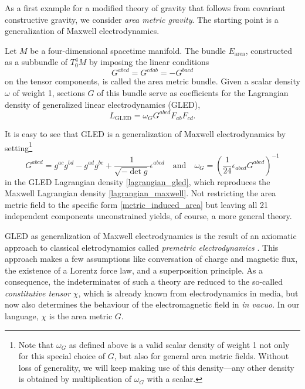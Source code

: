 As a first example for a modified theory of gravity that follows from covariant constructive gravity, we consider \emph{area metric gravity}. The starting point is a generalization of Maxwell electrodynamics.
\begin{definition}\label{def_gled}
  Let $M$ be a four-dimensional spacetime manifold. The bundle $E_\text{area}$, constructed as a subbundle of $T^4_0M$ by imposing the linear conditions
  \begin{equation}
    G^{abcd} = G^{cdab} = -G^{bacd}
  \end{equation}
  on the tensor components, is called the area metric bundle. Given a scalar density $\omega$ of weight 1, sections $G$ of this bundle serve as coefficients for the Lagrangian density of generalized linear electrodynamics (GLED),
  \begin{equation}\label{lagrangian_gled}
    L_\text{GLED} = \omega_G G^{abcd} F_{ab} F_{cd}.
  \end{equation}
\end{definition}
It is easy to see that GLED is a generalization of Maxwell electrodynamics by setting\footnote{Note that $\omega_G$ as defined above is a valid scalar density of weight 1 not only for this special choice of $G$, but also for general area metric fields. Without loss of generality, we will keep making use of this density---any other density is obtained by multiplication of $\omega_G$ with a scalar.}
\begin{equation}\label{metric_induced_area}
  G^{abcd} = g^{ac} g^{bd} - g^{ad} g^{bc} + \frac{1}{\sqrt{-\operatorname{det}g}} \epsilon^{abcd}\quad\text{and}\quad \omega_G = \left(\frac{1}{24}\epsilon_{abcd}G^{abcd}\right)^{-1}
\end{equation}
in the GLED Lagrangian density \eqref{lagrangian_gled}, which reproduces the Maxwell Lagrangian density \eqref{lagrangian_maxwell}. Not restricting the area metric field to the specific form \eqref{metric_induced_area} but leaving all 21 independent components unconstrained yields, of course, a more general theory.

GLED as generalization of Maxwell electrodynamics is the result of an axiomatic approach to classical eletrodynamics called \emph{premetric electrodynamics} \cite{Obukhov_1999,Hehl_2003}. This approach makes a few assumptions like conversation of charge and magnetic flux, the existence of a Lorentz force law, and a superposition principle. As a consequence, the indeterminates of such a theory are reduced to the so-called \emph{constitutive tensor} $\chi$, which is already known from electrodynamics in media, but now also determines the behaviour of the electromagnetic field in \emph{in vacuo}. In our language, $\chi$ is the area metric $G$.

